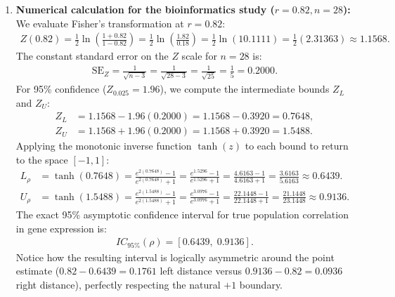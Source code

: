 \begin{solucion}
\begin{enumerate}
		\item \textbf{Numerical calculation for the bioinformatics study ($r = 0.82, n = 28$):}
		We evaluate Fisher's transformation at $r = 0.82$:
		\begin{align}
			Z(0.82) = \frac{1}{2} \ln\left( \frac{1 + 0.82}{1 - 0.82} \right) = \frac{1}{2} \ln\left( \frac{1.82}{0.18} \right) = \frac{1}{2} \ln(10.1111) = \frac{1}{2}(2.31363) \approx 1.1568.
		\end{align}
		The constant standard error on the $Z$ scale for $n = 28$ is:
		\begin{align}
			\text{SE}_Z = \frac{1}{\sqrt{n - 3}} = \frac{1}{\sqrt{28 - 3}} = \frac{1}{\sqrt{25}} = \frac{1}{5} = 0.2000.
		\end{align}
		For 95\% confidence ($Z_{0.025} = 1.96$), we compute the intermediate bounds $Z_L$ and $Z_U$:
		\begin{align}
			Z_L &= 1.1568 - 1.96(0.2000) = 1.1568 - 0.3920 = 0.7648, \\
			Z_U &= 1.1568 + 1.96(0.2000) = 1.1568 + 0.3920 = 1.5488.
		\end{align}
		Applying the monotonic inverse function $\tanh(z)$ to each bound to return to the space $[-1, 1]$:
		\begin{align}
			L_\rho &= \tanh(0.7648) = \frac{e^{2(0.7648)} - 1}{e^{2(0.7648)} + 1} = \frac{e^{1.5296} - 1}{e^{1.5296} + 1} = \frac{4.6163 - 1}{4.6163 + 1} = \frac{3.6163}{5.6163} \approx 0.6439. \\
			U_\rho &= \tanh(1.5488) = \frac{e^{2(1.5488)} - 1}{e^{2(1.5488)} + 1} = \frac{e^{3.0976} - 1}{e^{3.0976} + 1} = \frac{22.1448 - 1}{22.1448 + 1} = \frac{21.1448}{23.1448} \approx 0.9136.
		\end{align}
		The exact 95\% asymptotic confidence interval for true population correlation in gene expression is:
		\begin{align}
			IC_{95\%}(\rho) = [0.6439, \; 0.9136].
		\end{align}
		Notice how the resulting interval is logically asymmetric around the point estimate ($0.82 - 0.6439 = 0.1761$ left distance versus $0.9136 - 0.82 = 0.0936$ right distance), perfectly respecting the natural $+1$ boundary.
	\end{enumerate}
\end{solucion}

